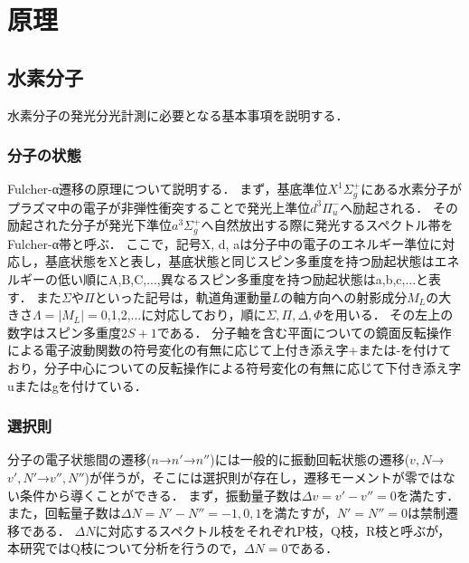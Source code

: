 \chapter{原理}

\section{水素分子}
水素分子の発光分光計測に必要となる基本事項を説明する．
\subsection{分子の状態}
Fulcher-α遷移の原理について説明する．
まず，基底準位$X^1 \Sigma^+_g$にある水素分子がプラズマ中の電子が非弾性衝突することで発光上準位$d^3 \Pi^-_u$へ励起される．
その励起された分子が発光下準位$a^3 \Sigma^+_g$へ自然放出する際に発光するスペクトル帯をFulcher-α帯と呼ぶ．
ここで，記号X, d, aは分子中の電子のエネルギー準位に対応し，基底状態をXと表し，基底状態と同じスピン多重度を持つ励起状態はエネルギーの低い順にA,B,C,...,異なるスピン多重度を持つ励起状態はa,b,c,...と表す．
また$\Sigma$や$\Pi$といった記号は，軌道角運動量$L$の軸方向への射影成分$M_L$の大きさ$\Lambda = |M_L|=$0,1,2,...に対応しており，順に$\Sigma,\Pi,\Delta,\Phi$を用いる\cite{bunsibunko-no-kiso}．
その左上の数字はスピン多重度$2S+1$である\cite{bunsibunko-no-kiso}．
分子軸を含む平面についての鏡面反転操作による電子波動関数の符号変化の有無に応じて上付き添え字+または-を付けており，分子中心についての反転操作による符号変化の有無に応じて下付き添え字uまたはgを付けている\cite{bunsibunko-no-kiso}．

\subsection{選択則}
分子の電子状態間の遷移($n$→$n'$→$n''$)には一般的に振動回転状態の遷移($v,N$→$v',N'$→$v'',N''$)が伴うが，そこには選択則が存在し，遷移モーメントが零ではない条件から導くことができる\cite{bunsibunko-no-kiso}．
まず，振動量子数は$\Delta v = v'-v'' = 0$を満たす．
また，回転量子数は$\Delta N = N' - N'' = -1,0,1$を満たすが，$N'=N''=0$は禁制遷移である．
$\Delta N$に対応するスペクトル枝をそれぞれP枝，Q枝，R枝と呼ぶが，本研究ではQ枝について分析を行うので，$\Delta N = 0$である．

